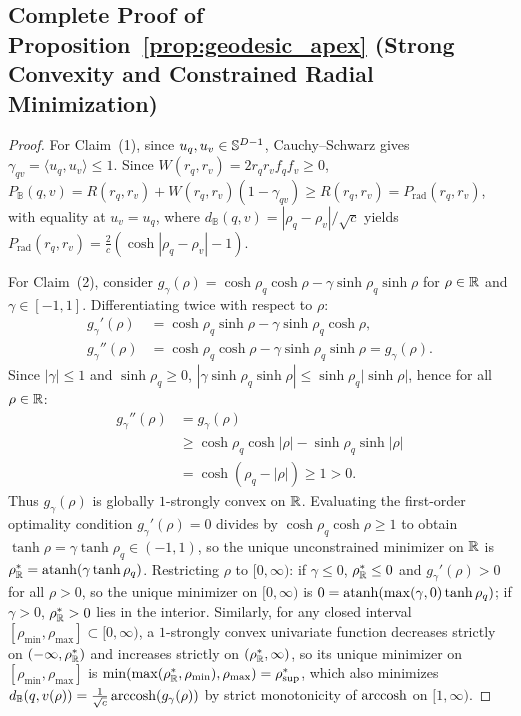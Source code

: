 \subsection{Complete Proof of Proposition~\ref{prop:geodesic_apex} (Strong Convexity and Constrained Radial Minimization)}
\begin{proof}
For Claim~(1), since $u_q, u_v \in \mathbb{S}^{D-1}$, Cauchy--Schwarz gives $\gamma_{qv} = \langle u_q, u_v\rangle \le 1$.
Since $W(r_q, r_v) = 2 r_q r_v f_q f_v \ge 0$, $P_{\mathbb{B}}(q, v) = R(r_q, r_v) + W(r_q, r_v)(1 - \gamma_{qv}) \ge R(r_q, r_v) = P_{\mathrm{rad}}(r_q, r_v)$, with equality at $u_v = u_q$, where $d_{\mathbb{B}}(q, v) = |\rho_q - \rho_v|/\sqrt{c}$ yields $P_{\mathrm{rad}}(r_q, r_v) = \frac{2}{c}(\cosh|\rho_q - \rho_v| - 1)$.

For Claim~(2), consider $g_\gamma(\rho) = \cosh\rho_q\cosh\rho - \gamma\sinh\rho_q\sinh\rho$ for $\rho \in \mathbb{R}$ and $\gamma \in [-1, 1]$.
Differentiating twice with respect to $\rho$:
\begin{align}
  g_\gamma'(\rho) &= \cosh\rho_q\sinh\rho - \gamma\sinh\rho_q\cosh\rho, \\
  g_\gamma''(\rho) &= \cosh\rho_q\cosh\rho - \gamma\sinh\rho_q\sinh\rho = g_\gamma(\rho).
\end{align}
Since $|\gamma| \le 1$ and $\sinh\rho_q \ge 0$, $|\gamma\sinh\rho_q\sinh\rho| \le \sinh\rho_q|\sinh\rho|$, hence for all $\rho \in \mathbb{R}$:
\begin{equation}
  \begin{aligned}
    g_\gamma''(\rho) &= g_\gamma(\rho) \\
    &\ge \cosh\rho_q\cosh|\rho| - \sinh\rho_q\sinh|\rho| \\
    &= \cosh(\rho_q - |\rho|) \ge 1 > 0.
  \end{aligned}
\end{equation}
Thus $g_\gamma(\rho)$ is globally $1$-strongly convex on $\mathbb{R}$.
Evaluating the first-order optimality condition $g_\gamma'(\rho) = 0$ divides by $\cosh\rho_q\cosh\rho \ge 1$ to obtain $\tanh\rho = \gamma\tanh\rho_q \in (-1, 1)$, so the unique unconstrained minimizer on $\mathbb{R}$ is $\rho_{\mathbb{R}}^* = \operatorname{atanh}(\gamma\tanh\rho_q)$.
Restricting $\rho$ to $[0, \infty)$: if $\gamma \le 0$, $\rho_{\mathbb{R}}^* \le 0$ and $g_\gamma'(\rho) > 0$ for all $\rho > 0$, so the unique minimizer on $[0, \infty)$ is $0 = \operatorname{atanh}(\max(\gamma, 0)\tanh\rho_q)$; if $\gamma > 0$, $\rho_{\mathbb{R}}^* > 0$ lies in the interior.
Similarly, for any closed interval $[\rho_{\min}, \rho_{\max}] \subset [0, \infty)$, a $1$-strongly convex univariate function decreases strictly on $(-\infty, \rho_{\mathbb{R}}^*)$ and increases strictly on $(\rho_{\mathbb{R}}^*, \infty)$, so its unique minimizer on $[\rho_{\min}, \rho_{\max}]$ is $\min(\max(\rho_{\mathbb{R}}^*, \rho_{\min}), \rho_{\max}) = \rho_{\mathrm{sup}}^*$, which also minimizes $d_{\mathbb{B}}(q, v(\rho)) = \frac{1}{\sqrt{c}}\operatorname{arccosh}(g_\gamma(\rho))$ by strict monotonicity of $\operatorname{arccosh}$ on $[1, \infty)$.
\end{proof}


